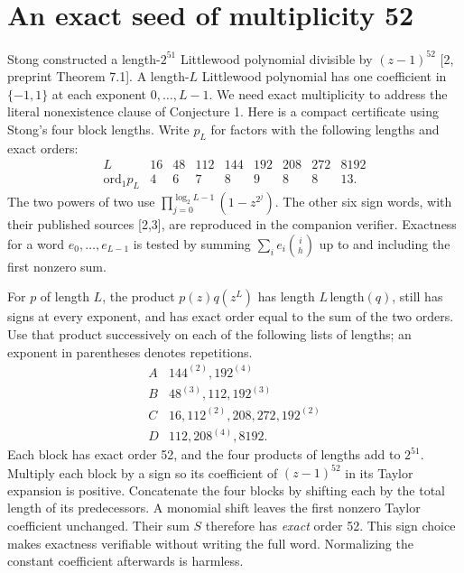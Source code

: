 \documentclass[11pt]{article}
\begin{document}
\section{An exact seed of multiplicity 52}
Stong constructed a length-$2^{51}$ Littlewood polynomial divisible by $(z-1)^{52}$ [2, preprint Theorem 7.1]. A length-$L$ Littlewood polynomial has one coefficient in $\{-1,1\}$ at each exponent $0,\dots,L-1$. We need exact multiplicity to address the literal nonexistence clause of Conjecture 1. Here is a compact certificate using Stong's four block lengths. Write $p_L$ for factors with the following lengths and exact orders:
\[
\begin{array}{c|rrrrrrrr}
 L&16&48&112&144&192&208&272&8192\\ \hline
 \mathrm{ord}_1p_L&4&6&7&8&9&8&8&13.
\end{array}
\]
The two powers of two use $\prod_{j=0}^{\log_2 L-1}(1-z^{2^j})$. The other six sign words, with their published sources [2,3], are reproduced in the companion verifier. Exactness for a word $e_0,\ldots,e_{L-1}$ is tested by summing $\sum_i e_i\binom ih$ up to and including the first nonzero sum.

For $p$ of length $L$, the product $p(z)q(z^L)$ has length $L\,\mathrm{length}(q)$, still has signs at every exponent, and has exact order equal to the sum of the two orders. Use that product successively on each of the following lists of lengths; an exponent in parentheses denotes repetitions.
\[
\begin{array}{c|l}
 A&144^{(2)},192^{(4)}\\
 B&48^{(3)},112,192^{(3)}\\
 C&16,112^{(2)},208,272,192^{(2)}\\
 D&112,208^{(4)},8192 .
\end{array}
\]
Each block has exact order 52, and the four products of lengths add to $2^{51}$. Multiply each block by a sign so its coefficient of $(z-1)^{52}$ in its Taylor expansion is positive. Concatenate the four blocks by shifting each by the total length of its predecessors. A monomial shift leaves the first nonzero Taylor coefficient unchanged. Their sum $S$ therefore has \emph{exact} order 52. This sign choice makes exactness verifiable without writing the full word. Normalizing the constant coefficient afterwards is harmless.
\end{document}
